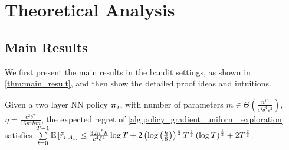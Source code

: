 \section{Theoretical Analysis}
\label{sec:theoretical_analysis}

\subsection{Main Results}
\label{subsec:main_results}

We first present the main results in the bandit settings, as shown in \cref{thm:main_result}, and then show the detailed proof ideas and  intuitions.

\begin{thm}
\label{thm:main_result}
    Given a two layer NN policy ${\boldsymbol{\pi}}_i$, with number of parameters $m \in \Theta\left( \frac{n^{10}}{c^4 \delta^4 \varepsilon^2} \right)$, $\eta = \frac{c^2 \delta^2}{16 n^4 h m}$, the expected regret of \cref{alg:policy_gradient_uniform_exploration} satisfies $\sum\limits_{t=0}^{T-1}{ {\mathbb{E}} \left[ \tilde{r}_{i, A_t} \right] } \le  \frac{32n^8h}{ c^4 \delta^4} \log{T} + 2 \left( \log{\left(\frac{h}{6}\right)}\right)^{\frac{1}{3}} T^{\frac{2}{3}} \left(\log{T}\right)^{\frac{1}{3}} + 2 T^{\frac{2}{3}}$.
\end{thm}
